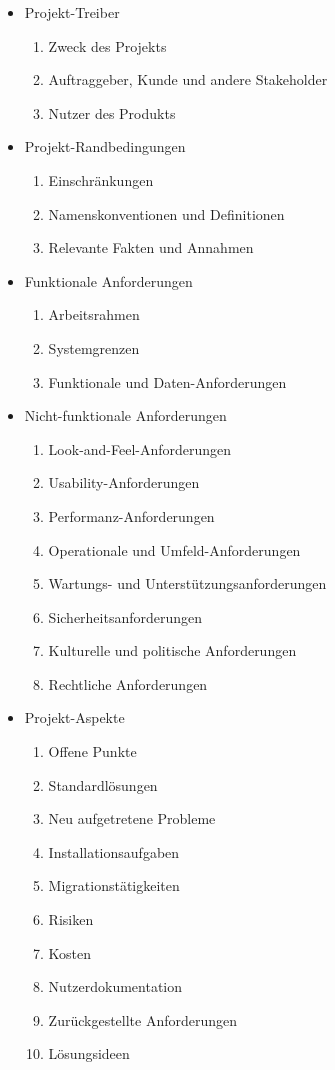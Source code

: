 \begin{minipage}{\linewidth}
	\begin{itemize}\label{abb:volereReqSpec}
		\item Projekt-Treiber
		\begin{enumerate}
			\item Zweck des Projekts
			\item Auftraggeber, Kunde und andere Stakeholder
			\item Nutzer des Produkts
		\end{enumerate}
		\item Projekt-Randbedingungen
		\begin{enumerate}
			\item Einschränkungen
			\item Namenskonventionen und Definitionen
			\item Relevante Fakten und Annahmen
		\end{enumerate}
		\item Funktionale Anforderungen
		\begin{enumerate}
			\item Arbeitsrahmen
			\item Systemgrenzen
			\item Funktionale und Daten-Anforderungen
		\end{enumerate}
		\item Nicht-funktionale Anforderungen
		\begin{enumerate}
			\item Look-and-Feel-Anforderungen
			\item Usability-Anforderungen
			\item Performanz-Anforderungen
			\item Operationale und Umfeld-Anforderungen
			\item Wartungs- und Unterstützungsanforderungen
			\item Sicherheitsanforderungen
			\item Kulturelle und politische Anforderungen
			\item Rechtliche Anforderungen
		\end{enumerate}
		\item Projekt-Aspekte
		\begin{enumerate}
			\item Offene Punkte
			\item Standardlösungen
			\item Neu aufgetretene Probleme
			\item Installationsaufgaben
			\item Migrationstätigkeiten
			\item Risiken
			\item Kosten
			\item Nutzerdokumentation
			\item Zurückgestellte Anforderungen
			\item Lösungsideen
		\end{enumerate}
	\end{itemize}
\end{minipage}

